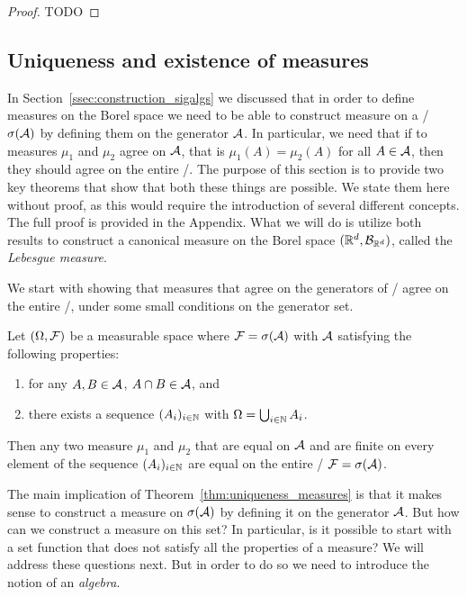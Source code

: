 \begin{proof}
TODO
\end{proof}

\subsection{Uniqueness and existence of measures}\label{ssec:uniqueness_existence_measures}

In Section~\ref{ssec:construction_sigalgs} we discussed that in order to define measures on the Borel space we need to be able to construct measure on a \sigalg/ $\sigma(\mathcal A)$ by defining them on the generator $\mathcal A$. In particular, we need that if to measures $\mu_1$ and $\mu_2$ agree on $\mathcal A$, that is $\mu_1(A) = \mu_2(A)$ for all $A \in \mathcal A$, then they should agree on the entire \sigalg/. The purpose of this section is to provide two key theorems that show that both these things are possible. We state them here without proof, as this would require the introduction of several different concepts. The full proof is provided in the Appendix. What we will do is utilize both results to construct a canonical measure on the Borel space $(\mathbb R^d, \mathcal B_{\mathbb R^d})$, called the \emph{Lebesgue measure}.

We start with showing that measures that agree on the generators of \sigalgs/ agree on the entire \sigalg/, under some small conditions on the generator set.

\begin{theorem}\label{thm:uniqueness_measures}
Let $(\Omega ,\mathcal F)$ be a measurable space where $\mathcal F = \sigma(\mathcal A)$ with $\mathcal A$ satisfying the following properties:
\begin{enumerate}
\item for any $A, B \in \mathcal A$, $A \cap B \in \mathcal A$, and
\item there exists a sequence $(A_i)_{i \in \mathbb N}$ with $\Omega = \bigcup_{i \in \mathbb N} A_i$.
\end{enumerate}
Then any two measure $\mu_1$ and $\mu_2$ that are equal on $\mathcal A$ and are finite on every element of the sequence $(A_i)_{i \in \mathbb N}$ are equal on the entire \sigalg/ $\mathcal F = \sigma(\mathcal A)$.
\end{theorem}

The main implication of Theorem~\ref{thm:uniqueness_measures} is that it makes sense to construct a measure on $\sigma(\mathcal A)$ by defining it on the generator $\mathcal A$. But how can we construct a measure on this set? In particular, is it possible to start with a set function that does not satisfy all the properties of a measure? We will address these questions next. But in order to do so we need to introduce the notion of an \emph{algebra}.

